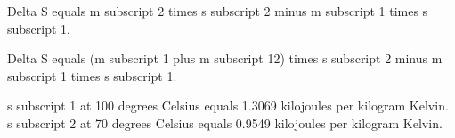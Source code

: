 Delta S equals m subscript 2 times s subscript 2 minus m subscript 1 times s subscript 1.  

Delta S equals (m subscript 1 plus m subscript 12) times s subscript 2 minus m subscript 1 times s subscript 1.  

s subscript 1 at 100 degrees Celsius equals 1.3069 kilojoules per kilogram Kelvin.  
s subscript 2 at 70 degrees Celsius equals 0.9549 kilojoules per kilogram Kelvin.